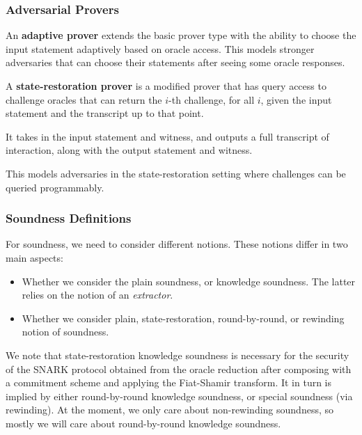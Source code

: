 \subsubsection{Adversarial Provers}

\begin{definition}
    \label{def:adaptive_prover}
    An \textbf{adaptive prover} extends the basic prover type with the ability to choose the input statement adaptively based on oracle access. This models stronger adversaries that can choose their statements after seeing some oracle responses.
\end{definition}

\begin{definition}
    \label{def:sr_prover}
    A \textbf{state-restoration prover} is a modified prover that has query access to challenge oracles that can return the $i$-th challenge, for all $i$, given the input statement and the transcript up to that point.

    It takes in the input statement and witness, and outputs a full transcript of interaction,
    along with the output statement and witness.

    This models adversaries in the state-restoration setting where challenges can be queried programmably.
\end{definition}

\subsubsection{Soundness Definitions}

For soundness, we need to consider different notions. These notions differ in two main aspects:
\begin{itemize}
    \item Whether we consider the plain soundness, or knowledge soundness. The latter relies on the
    notion of an \emph{extractor}.
    \item Whether we consider plain, state-restoration, round-by-round, or rewinding notion of
    soundness.
\end{itemize}

We note that state-restoration knowledge soundness is necessary for the security of the SNARK
protocol obtained from the oracle reduction after composing with a commitment scheme and applying
the Fiat-Shamir transform. It in turn is implied by either round-by-round knowledge soundness, or
special soundness (via rewinding). At the moment, we only care about non-rewinding soundness, so mostly we will care about round-by-round knowledge soundness.

